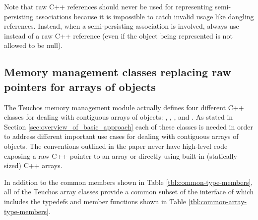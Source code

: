 \documentclass[pdf,ps2pdf,11pt]{SANDreport}
\begin{document}
Note that raw C++ references should never be used for representing
semi-persisting associations because it is impossible to catch invalid usage
like dangling references.  Instead, when a semi-persisting association is
involved, always use {} instead of a raw C++ reference (even if the
object being represented is not allowed to be null).


%
{}\subsection{Memory management classes replacing raw pointers for
arrays of objects}
\label{sec:array-classes}
%

The Teuchos memory management module actually defines four different
C++ classes for dealing with contiguous arrays of objects:
{}, {}, {}, and {}.
As stated in Section {}\ref{sec:overview_of_basic_approach} each of
these classes is needed in order to address different important use
cases for dealing with contiguous arrays of objects.  The conventions
outlined in the paper never have high-level code exposing a raw C++
pointer to an array or directly using built-in (statically sized) C++
arrays.

In addition to the common members shown in Table
{}\ref{tbl:common-type-members}, all of the Teuchos array classes
provide a common subset of the interface of {} which
includes the typedefs and member functions shown in Table
{}\ref{tbl:common-array-type-members}.
\end{document}
